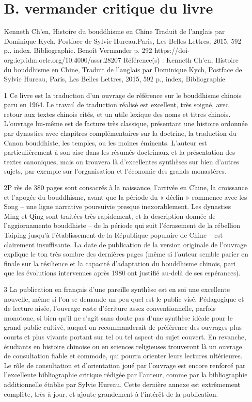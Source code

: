 \section{B. vermander critique du livre}

Kenneth Ch’en, Histoire du bouddhisme en Chine
Traduit de l’anglais par Dominique Kych. Postface de Sylvie Hureau.Paris, Les Belles Lettres, 2015, 592 p., index. Bibliographie.
Benoît Vermander
p. 292
https://doi-org.icp.idm.oclc.org/10.4000/assr.28207
Référence(s) :
Kenneth Ch’en, Histoire du bouddhisme en Chine, Traduit de l’anglais par Dominique Kych, Postface de Sylvie Hureau, Paris, Les Belles Lettres, 2015, 592 p., index, Bibliographie

1 Ce livre est la traduction d’un ouvrage de référence sur le bouddhisme chinois paru en 1964. Le travail de traduction réalisé est excellent, très soigné, avec retour aux textes chinois cités, et un utile lexique des noms et titres chinois. L’ouvrage lui-même est de facture très classique, présentant une histoire ordonnée par dynasties avec chapitres complémentaires sur la doctrine, la traduction du Canon bouddhiste, les temples, ou les moines éminents. L’auteur est particulièrement à son aise dans les résumés doctrinaux et la présentation des textes canoniques, mais on trouvera là d’excellentes synthèses sur bien d’autres sujets, par exemple sur l’organisation et l’économie des grands monastères.

2P rès de 380 pages sont consacrés à la naissance, l’arrivée en Chine, la croissance et l’apogée du bouddhisme, avant que la période du « déclin » commence avec les Song – une ligne narrative poursuivie presque inexorablement. Les dynasties Ming et Qing sont traitées très rapidement, et la description donnée de l’aggiornamento bouddhiste – de la période qui suit l’écrasement de la rébellion Taiping jusqu’à l’établissement de la République populaire de Chine – est clairement insuffisante. La date de publication de la version originale de l’ouvrage explique le ton très sombre des dernières pages (même si l’auteur semble parier en finale sur la résilience et la capacité d’adaptation du bouddhisme chinois, pari que les évolutions intervenues après 1980 ont justifié au-delà de ses espérances).

3 La publication en français d’une pareille synthèse est en soi une excellente nouvelle, même si l’on se demande un peu quel est le public visé. Pédagogique et de lecture aisée, l’ouvrage reste d’écriture assez conventionnelle, parfois monotone, si bien qu’il ne s’agit sans doute pas d’une synthèse idéale pour le grand public cultivé, auquel on recommanderait de préférence des ouvrages plus courts et plus vivants portant sur tel ou tel aspect du sujet couvert. En revanche, étudiants en histoire chinoise ou en sciences religieuses trouveront là un ouvrage de consultation fiable et commode, qui pourra orienter leurs lectures ultérieures. Le rôle de consultation et d’orientation joué par l’ouvrage est encore renforcé par l’excellente bibliographie critique rédigée par l’auteur, comme par la bibliographie additionnelle établie par Sylvie Hureau. Cette dernière annexe est extrêmement complète, très à jour, et ajoute grandement à l’intérêt de la publication.

